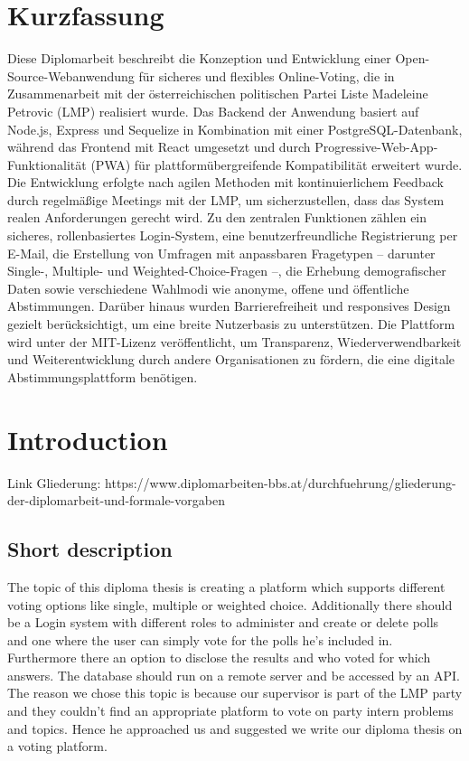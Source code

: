 \documentclass[a4paper,12pt]{report}
\begin{document}
\chapter*{Kurzfassung}
Diese Diplomarbeit beschreibt die Konzeption und Entwicklung einer Open-Source-Webanwendung für sicheres und flexibles Online-Voting, die in Zusammenarbeit mit der österreichischen politischen Partei Liste Madeleine Petrovic (LMP) realisiert wurde. Das Backend der Anwendung basiert auf Node.js, Express und Sequelize in Kombination mit einer PostgreSQL-Datenbank, während das Frontend mit React umgesetzt und durch Progressive-Web-App-Funktionalität (PWA) für plattformübergreifende Kompatibilität erweitert wurde. Die Entwicklung erfolgte nach agilen Methoden mit kontinuierlichem Feedback durch regelmäßige Meetings mit der LMP, um sicherzustellen, dass das System realen Anforderungen gerecht wird. Zu den zentralen Funktionen zählen ein sicheres, rollenbasiertes Login-System, eine benutzerfreundliche Registrierung per E-Mail, die Erstellung von Umfragen mit anpassbaren Fragetypen – darunter Single-, Multiple- und Weighted-Choice-Fragen –, die Erhebung demografischer Daten sowie verschiedene Wahlmodi wie anonyme, offene und öffentliche Abstimmungen. Darüber hinaus wurden Barrierefreiheit und responsives Design gezielt berücksichtigt, um eine breite Nutzerbasis zu unterstützen. Die Plattform wird unter der MIT-Lizenz veröffentlicht, um Transparenz, Wiederverwendbarkeit und Weiterentwicklung durch andere Organisationen zu fördern, die eine digitale Abstimmungsplattform benötigen.
\newpage

\tableofcontents
\newpage

\chapter{Introduction}
Link Gliederung: https://www.diplomarbeiten-bbs.at/durchfuehrung/gliederung-der-diplomarbeit-und-formale-vorgaben
\section{Short description}

The topic of this diploma thesis is creating a platform which supports different voting options like single, multiple or weighted choice. Additionally there should be a Login system with different roles to administer and create or delete polls and one where the user can simply vote for the polls he's included in. Furthermore there an option to disclose the results and who voted for which answers. The database should run on a remote server and be accessed by an API. \\
The reason we chose this topic is because our supervisor is part of the LMP party and they couldn't find an appropriate platform to vote on party intern problems and topics. Hence he approached us and suggested we write our diploma thesis on a voting platform.
\end{document}
